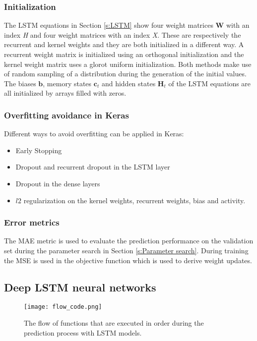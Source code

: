 \subsubsection{Initialization}
The LSTM equations in Section \ref{s:LSTM} show four weight matrices $ \bm{W} $ with an index \textit{H} and four weight matrices with an index \textit{X}. These are respectively the recurrent and kernel weights and they are both initialized in a different way. A recurrent weight matrix is initialized using an orthogonal initialization and the kernel weight matrix uses a glorot uniform initialization. Both methods make use of random sampling of a distribution  during the generation of the initial values. The biases $ \bm{b} $, memory states $ \bm{c}_t $ and hidden states $ \bm{H}_t $ of the LSTM equations are all initialized by arrays filled with zeros.\\

\subsubsection{Overfitting avoidance in Keras}
Different ways to avoid overfitting can be applied in Keras:
\begin{itemize}
	\item Early Stopping
	\item Dropout and recurrent dropout in the LSTM layer
	\item Dropout in the dense layers
	\item $ l2 $ regularization on the kernel weights, recurrent weights, bias and activity.
\end{itemize}


\subsubsection{Error metrics}
The  MAE metric is used to evaluate the prediction performance on the validation set during the parameter search in Section \ref{s:Parameter search}. During training the MSE is used in the objective function which is used to derive weight updates.


\subsection{Deep LSTM neural networks}\label{s:Deep LSTM neural networks}
\begin{figure}[ht]
	\centering
	\texttt{[image: flow\_code.png]}
	\caption{The flow of functions that are executed in order during the prediction process with LSTM models.}
	\label{fig:model1}
\end{figure}


